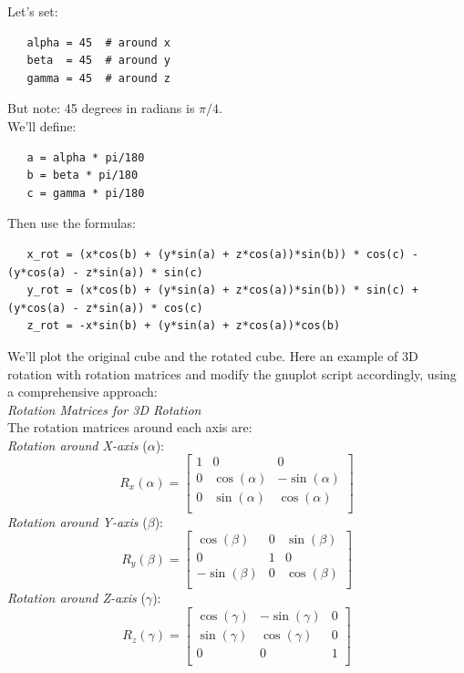 \documentclass[a4paper,10pt]{article}
\begin{document}
Let's set:
\begin{verbatim}
   alpha = 45  # around x
   beta  = 45  # around y
   gamma = 45  # around z
\end{verbatim}
But note: 45 degrees in radians is \(\pi/4\).\\
We'll define:
\begin{verbatim}
   a = alpha * pi/180
   b = beta * pi/180
   c = gamma * pi/180
\end{verbatim}
Then use the formulas:\\
{
\scriptsize
\begin{verbatim}
   x_rot = (x*cos(b) + (y*sin(a) + z*cos(a))*sin(b)) * cos(c) - (y*cos(a) - z*sin(a)) * sin(c)
   y_rot = (x*cos(b) + (y*sin(a) + z*cos(a))*sin(b)) * sin(c) + (y*cos(a) - z*sin(a)) * cos(c)
   z_rot = -x*sin(b) + (y*sin(a) + z*cos(a))*cos(b)
\end{verbatim}
}
We'll plot the original cube and the rotated cube.
Here an example of 3D rotation with rotation matrices and modify the gnuplot script accordingly, using a comprehensive approach:\\
\emph{Rotation Matrices for 3D Rotation}\\
The rotation matrices around each axis are:\\
\emph{Rotation around X-axis} ($\alpha$):\\
\[
R_x(\alpha)
=
\begin{bmatrix}
         1   &          0 &         0     \\
         0   &\cos(\alpha)&  -\sin(\alpha)\\
         0   &\sin(\alpha)&   \cos(\alpha)\\
\end{bmatrix}
\]
\emph{Rotation around Y-axis} (\(\beta\)):\\
\[
R_y(\beta)
=
\begin{bmatrix}
         \cos(\beta) &   0 &   \sin(\beta)\\
              0      &   1 &          0   \\
         -\sin(\beta)&   0 &   \cos(\beta)\\
\end{bmatrix}
\]
\emph{Rotation around Z-axis} (\(\gamma\)):\\
\[
R_z(\gamma)
=
\begin{bmatrix}
         \cos(\gamma)&   -\sin(\gamma)&   0\\
         \sin(\gamma)&    \cos(\gamma)&   0\\
             0       &          0     &   1\\
\end{bmatrix}
\]
\end{document}
